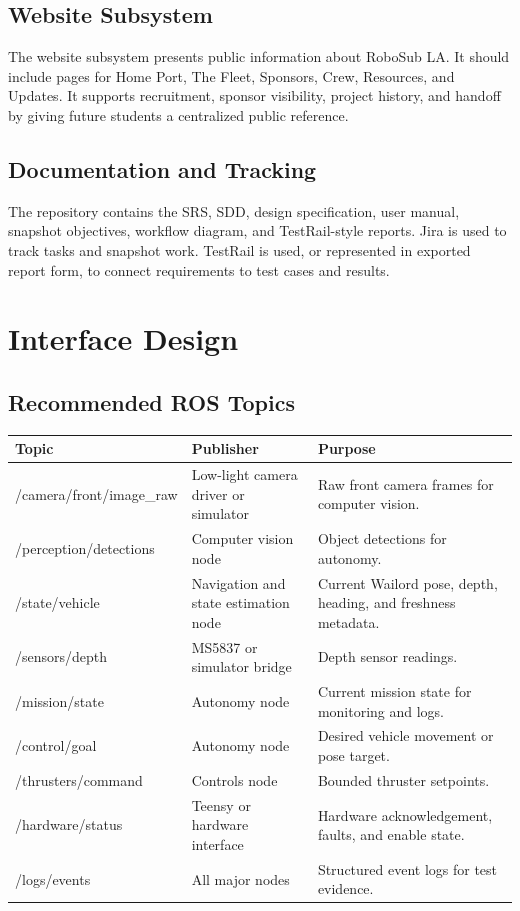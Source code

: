 \documentclass[12pt]{article}
\begin{document}
\subsection{Website Subsystem}
The website subsystem presents public information about RoboSub LA. It should include pages for Home Port, The Fleet, Sponsors, Crew, Resources, and Updates. It supports recruitment, sponsor visibility, project history, and handoff by giving future students a centralized public reference.

\subsection{Documentation and Tracking}
The repository contains the SRS, SDD, design specification, user manual, snapshot objectives, workflow diagram, and TestRail-style reports. Jira is used to track tasks and snapshot work. TestRail is used, or represented in exported report form, to connect requirements to test cases and results.

\section{Interface Design}
\subsection{Recommended ROS Topics}
\begin{longtable}{|p{}|p{}|p{}|}
\hline
\textbf{Topic} & \textbf{Publisher} & \textbf{Purpose} \\
\hline
/camera/front/image\_raw & Low-light camera driver or simulator & Raw front camera frames for computer vision. \\
\hline
/perception/detections & Computer vision node & Object detections for autonomy. \\
\hline
/state/vehicle & Navigation and state estimation node & Current Wailord pose, depth, heading, and freshness metadata. \\
\hline
/sensors/depth & MS5837 or simulator bridge & Depth sensor readings. \\
\hline
/mission/state & Autonomy node & Current mission state for monitoring and logs. \\
\hline
/control/goal & Autonomy node & Desired vehicle movement or pose target. \\
\hline
/thrusters/command & Controls node & Bounded thruster setpoints. \\
\hline
/hardware/status & Teensy or hardware interface & Hardware acknowledgement, faults, and enable state. \\
\hline
/logs/events & All major nodes & Structured event logs for test evidence. \\
\hline
\end{longtable}
\end{document}
